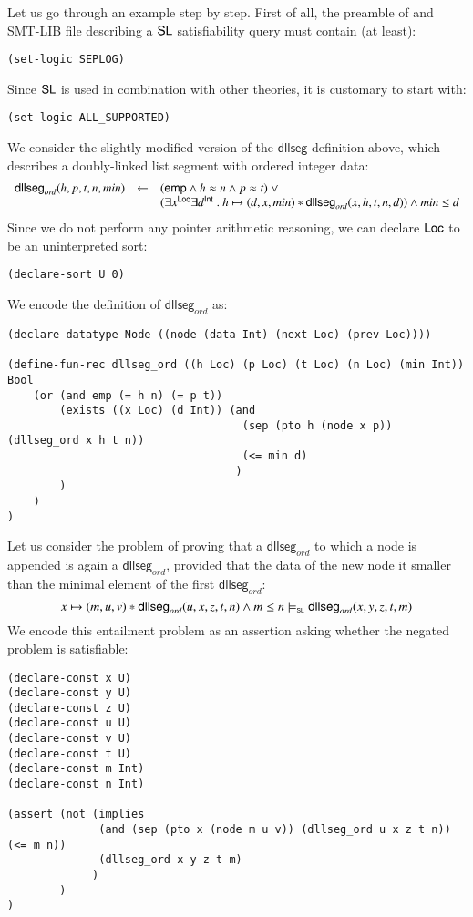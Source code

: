 \documentclass{llncs}
\begin{document}
Let us go through an example step by step. First of all, the preamble
of and SMT-LIB file describing a $\mathsf{SL}$ satisfiability query must
contain (at least): 
\begin{verbatim}
(set-logic SEPLOG)
\end{verbatim}
Since $\mathsf{SL}$ is used in combination with other theories, it is
customary to start with:
\begin{verbatim}
(set-logic ALL_SUPPORTED)
\end{verbatim}
We consider the slightly modified version of the $\mathsf{dllseg}$
definition above, which describes a doubly-linked list segment with
ordered integer data: 
\[\begin{array}{rcl}
\mathsf{dllseg}_{\mathit{ord}}(h, p, t, n, min) & \leftarrow & (\mathsf{emp} \wedge h \approx n \wedge p \approx t) ~\vee \\
&& (\exists x^{\mathsf{Loc}} \exists d^{\mathsf{Int}} ~.~ h \mapsto (d,x,min) * \mathsf{dllseg}_{\mathit{ord}}(x,h,t,n,d)) \wedge min \leq d
\end{array}\]
Since we do not perform any pointer arithmetic reasoning, we can
declare $\mathsf{Loc}$ to be an uninterpreted sort: 
\begin{verbatim}
(declare-sort U 0)
\end{verbatim}
We encode the definition of $\mathsf{dllseg}_{\mathit{ord}}$ as: 
\begin{verbatim}
(declare-datatype Node ((node (data Int) (next Loc) (prev Loc))))

(define-fun-rec dllseg_ord ((h Loc) (p Loc) (t Loc) (n Loc) (min Int)) Bool
    (or (and emp (= h n) (= p t))
        (exists ((x Loc) (d Int)) (and 
                                    (sep (pto h (node x p)) (dllseg_ord x h t n)) 
                                    (<= min d)
                                   )
        )
    )
)
\end{verbatim}
Let us consider the problem of proving that a
$\mathsf{dllseg}_{\mathit{ord}}$ to which a node is appended is again
a $\mathsf{dllseg}_{\mathit{ord}}$, provided that the data of the new
node it smaller than the minimal element of the first
$\mathsf{dllseg}_{\mathit{ord}}$:
\[x \mapsto (m,u,v) * \mathsf{dllseg}_{\mathit{ord}}(u,x,z,t,n) \wedge m \leq n
\models_{\mathsf{\scriptscriptstyle{SL}}} \mathsf{dllseg}_{\mathit{ord}}(x,y,z,t,m)\]
We encode this entailment problem as an assertion asking whether the negated problem is satisfiable:  
\begin{verbatim}
(declare-const x U)
(declare-const y U)
(declare-const z U)
(declare-const u U)
(declare-const v U)
(declare-const t U)
(declare-const m Int)
(declare-const n Int)

(assert (not (implies 
              (and (sep (pto x (node m u v)) (dllseg_ord u x z t n)) (<= m n)) 
              (dllseg_ord x y z t m)
             )
        )
)
\end{verbatim}
\end{document}

